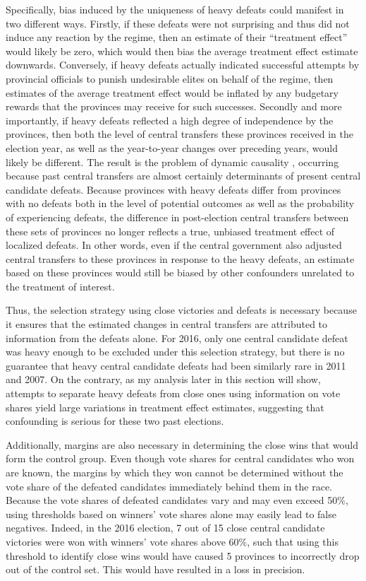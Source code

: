 \documentclass[12pt]{article}
\newcommand{\1}{\mathbbm{1}}
\begin{document}
Specifically, bias induced by the uniqueness of heavy defeats could manifest in two different ways. Firstly, if these defeats were not surprising and thus did not induce any reaction by the regime, then an estimate of their ``treatment effect'' would likely be zero, which would then bias the average treatment effect estimate downwards. Conversely, if heavy defeats actually indicated successful attempts by provincial officials to punish undesirable elites on behalf of the regime, then estimates of the average treatment effect would be inflated by any budgetary rewards that the provinces may receive for such successes. Secondly and more importantly, if heavy defeats reflected a high degree of independence by the provinces, then both the level of central transfers these provinces received in the election year, as well as the year-to-year changes over preceding years, would likely be different. The result is the problem of dynamic causality \parencite{ImaiKim2019}, occurring because past central transfers are almost certainly determinants of present central candidate defeats. Because provinces with heavy defeats differ from provinces with no defeats both in the level of potential outcomes as well as the probability of experiencing defeats, the difference in post-election central transfers between these sets of provinces no longer reflects a true, unbiased treatment effect of localized defeats. In other words, even if the central government also adjusted central transfers to these provinces in response to the heavy defeats, an estimate based on these provinces would still be biased by other confounders unrelated to the treatment of interest. 

Thus, the selection strategy using close victories and defeats is necessary because it ensures that the estimated changes in central transfers are attributed to information from the defeats alone. For 2016, only one central candidate defeat was heavy enough to be excluded under this selection strategy, but there is no guarantee that heavy central candidate defeats had been similarly rare in 2011 and 2007. On the contrary, as my analysis later in this section will show, attempts to separate heavy defeats from close ones using information on vote shares yield large variations in treatment effect estimates, suggesting that confounding is serious for these two past elections.

Additionally, margins are also necessary in determining the close wins that would form the control group. Even though vote shares for central candidates who won are known, the margins by which they won cannot be determined without the vote share of the defeated candidates immediately behind them in the race. Because the vote shares of defeated candidates vary and may even exceed 50\%, using thresholds based on winners' vote shares alone may easily lead to false negatives. Indeed, in the 2016 election, 7 out of 15 close central candidate victories were won with winners' vote shares above 60\%, such that using this threshold to identify close wins would have caused 5 provinces to incorrectly drop out of the control set. This would have resulted in a loss in precision.
\end{document}

